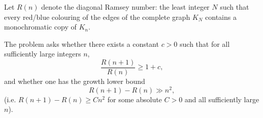Let $R(n)$ denote the diagonal Ramsey number: the least integer $N$ such that every red/blue colouring of the edges of the complete graph $K_N$ contains a monochromatic copy of $K_n$.

The problem asks whether there exists a constant $c>0$ such that for all sufficiently large integers $n$,
\[
\frac{R(n+1)}{R(n)} \ge 1+c,
\]
and whether one has the growth lower bound
\[
R(n+1)-R(n) \gg n^2,
\]
(i.e. $R(n+1)-R(n) \ge C n^2$ for some absolute $C>0$ and all sufficiently large $n$).
